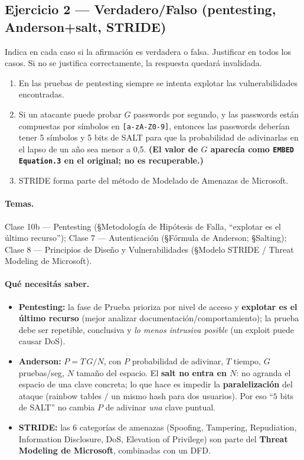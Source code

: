 \subsection{Ejercicio 2 — Verdadero/Falso (pentesting, Anderson+salt, STRIDE)}

\begin{consigna}
Indica en cada caso si la afirmación es verdadera o falsa. Justificar en todos los casos. Si no se justifica correctamente, la respuesta quedará invalidada.
\begin{enumerate}
  \item En las pruebas de pentesting siempre se intenta explotar las vulnerabilidades encontradas.
  \item Si un atacante puede probar $G$ passwords por segundo, y las passwords están compuestas por símbolos en \texttt{[a-zA-Z0-9]}, entonces las passwords deberían tener 5 símbolos y 5 bits de SALT para que la probabilidad de adivinarlas en el lapso de un año sea menor a 0,5. \textbf{(El valor de $G$ aparecía como \texttt{EMBED Equation.3} en el original; no es recuperable.)}
  \item STRIDE forma parte del método de Modelado de Amenazas de Microsoft.
\end{enumerate}
\end{consigna}

\paragraph{Temas.}
Clase 10b — Pentesting (\S Metodología de Hipótesis de Falla, ``explotar es el último recurso''); Clase 7 — Autenticación (\S Fórmula de Anderson; \S Salting); Clase 8 — Principios de Diseño y Vulnerabilidades (\S Modelo STRIDE / Threat Modeling de Microsoft).

\paragraph{Qué necesitás saber.}
\begin{itemize}
  \item \textbf{Pentesting:} la fase de Prueba prioriza por nivel de acceso y \textbf{explotar es el último recurso} (mejor analizar documentación/comportamiento); la prueba debe ser repetible, conclusiva y \emph{lo menos intrusiva posible} (un exploit puede causar DoS).
  \item \textbf{Anderson:} $P = T\,G/N$, con $P$ probabilidad de adivinar, $T$ tiempo, $G$ pruebas/seg, $N$ tamaño del espacio. El \textbf{salt no entra en $N$}: no agranda el espacio de una clave concreta; lo que hace es impedir la \textbf{paralelización} del ataque (rainbow tables / un mismo hash para dos usuarios). Por eso ``$5$ bits de SALT'' no cambia $P$ de adivinar \emph{una} clave puntual.
  \item \textbf{STRIDE:} las 6 categorías de amenazas (Spoofing, Tampering, Repudiation, Information Disclosure, DoS, Elevation of Privilege) son parte del \textbf{Threat Modeling de Microsoft}, combinadas con un DFD.
\end{itemize}


